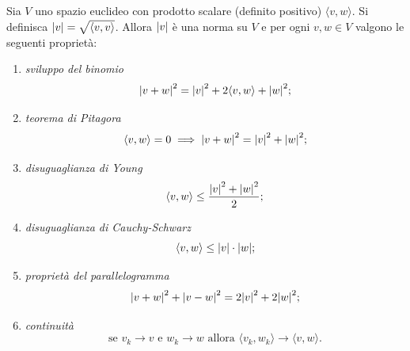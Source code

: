 \begin{theorem}
\label{th:spazio_euclideo}%
Sia $V$ uno spazio euclideo con prodotto scalare (definito positivo) $\langle v, w\rangle$.
Si definisca ${\left|v\right|} = \sqrt{\langle v,v\rangle}$.
Allora ${\left|v\right|}$ è una norma su $V$
e per ogni $v,w\in V$ valgono le seguenti proprietà:
\begin{enumerate}
\item \emph{sviluppo del binomio}%
%
\begin{equation}\label{eq:binomio_vettoriale}%
  \abs{v+w}^2 = \abs{v}^2 + 2 \langle v,w\rangle + \abs{w}^2;
\end{equation}
\item \emph{teorema di Pitagora}%
%
%
\begin{equation}\label{eq:Pitagora}
  \langle v,w\rangle=0 \implies {\left|v+w\right|}^2 = {\left|v\right|}^2 + {\left|w\right|}^2;
\end{equation}
\item \emph{disuguaglianza di Young}%
%
%
\begin{equation}\label{eq:Young}
  \langle v,w\rangle \le \frac{{\left|v\right|}^2 + {\left|w\right|}^2}{2};
\end{equation}
\item \emph{disuguaglianza di Cauchy-Schwarz}%
%
%
%
\begin{equation}\label{eq:Cauchy_Schwarz}
   \langle v,w \rangle \le {\left|v\right|} \cdot {\left|w\right|};
\end{equation}
\item \emph{proprietà del parallelogramma}%
%
\begin{equation}\label{eq:parallelogramma}
  {\left|v+w\right|}^2 + {\left|v-w\right|}^2 = 2 {\left|v\right|}^2 + 2{\left|w\right|}^2;
\end{equation}
\item \emph{continuità}
\[
  \text{se $v_k\to v$ e $w_k\to w$ allora
  $\langle v_k,w_k\rangle \to \langle v,w \rangle$}.
\]
\end{enumerate}
\end{theorem}
%
